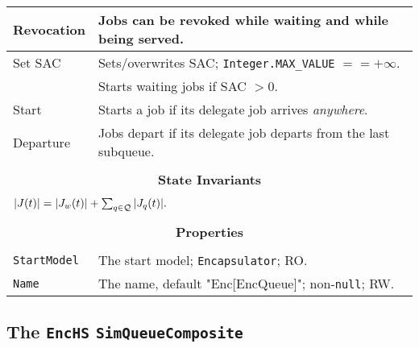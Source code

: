 \begin{tabular}{|l|l|}
	\hline
	Revocation & Jobs can be revoked while waiting and while being served. \\
	\hline
	Set SAC & Sets/overwrites SAC; \lstinline|Integer.MAX_VALUE| $== +\infty$. \\
	& Starts waiting jobs if SAC $> 0$. \\
	\hline
	Start & Starts a job if its delegate job arrives {\em anywhere}. \\
	\hline
	Departure & Jobs depart if its delegate job departs from the last subqueue. \\
	\hline
	\multicolumn{2}{|c|}{} \\
	\multicolumn{2}{|c|}{\bf State  Invariants} \\
	\multicolumn{2}{|c|}{} \\
	\hline
	\multicolumn{2}{|l|}{$|J(t)| = |J_{w}(t)| + \sum_{q \in \cal{Q}} |J_{q}(t)|.$} \\
	\hline
	\multicolumn{2}{|c|}{} \\
	\multicolumn{2}{|c|}{\bf Properties} \\
	\multicolumn{2}{|c|}{} \\
	\hline
	\lstinline|StartModel|    & The start model; \lstinline|Encapsulator|; RO. \\
	\hline
	\lstinline|Name|          & The name, default "Enc[EncQueue]"; non-\lstinline|null|; RW. \\
	\hline
\end{tabular}

\subsection{The \lstinline{EncHS} \lstinline{SimQueueComposite}}
\label{sec:EncHS}

